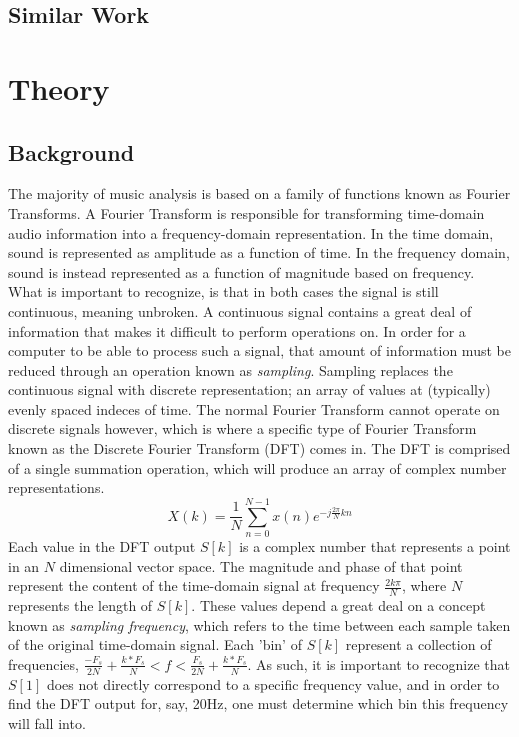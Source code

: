 \documentclass[conference]{IEEEtran}
\begin{document}
\subsection{Similar Work}
\section{Theory}
\subsection{Background}
The majority of music analysis is based on a family of functions known as Fourier Transforms. A Fourier Transform is responsible for transforming time-domain audio information into a frequency-domain representation. In the time domain, sound is represented as amplitude as a function of time. In the frequency domain, sound is instead represented as a function of magnitude based on frequency. What is important to recognize, is that in both cases the signal is still continuous, meaning unbroken. A continuous signal contains a great deal of information that makes it difficult to perform operations on. In order for a computer to be able to process such a signal, that amount of information must be reduced through an operation known as \textit{sampling}. Sampling replaces the continuous signal with discrete representation; an array of values at (typically) evenly spaced indeces of time. The normal Fourier Transform cannot operate on discrete signals however, which is where a specific type of Fourier Transform known as the Discrete Fourier Transform (DFT) comes in. The DFT is comprised of a single summation operation, which will produce an array of complex number representations.
\begin{equation}
  X(k)=\frac{1}{N}\sum_{n=0}^{N-1}x(n)e^{-j\frac{2\pi}{N}kn}\label{DFT}
\end{equation}
Each value in the DFT output $S[k]$ is a complex number that represents a point in an $N$ dimensional vector space. The magnitude and phase of that point represent the content of the time-domain signal at frequency $\frac{2k\pi}{N}$, where $N$ represents the length of $S[k]$. These values depend a great deal on a concept known as \textit{sampling frequency}, which refers to the time between each sample taken of the original time-domain signal. Each 'bin' of $S[k]$ represent a collection of frequencies, $\frac{-F_{s}}{2N} + \frac{k*F_{s}}{N} < f < \frac{F_{s}}{2N} + \frac{k*F_{s}}{N}$. As such, it is important to recognize that $S[1]$ does not directly correspond to a specific frequency value, and in order to find the DFT output for, say, 20Hz, one must determine which bin this frequency will fall into.
\end{document}
